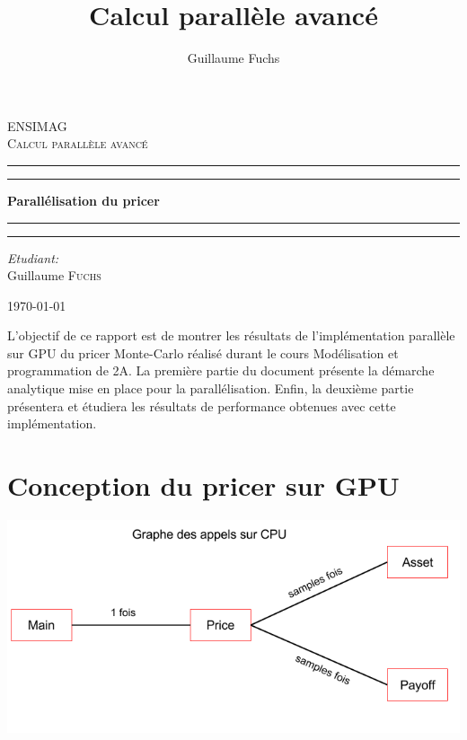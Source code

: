 \documentclass[french,12pt,a4paper]{article}
\title{Calcul parallèle avancé}
\author{Guillaume Fuchs}
\begin{document}
\begin{titlepage}
\begin{center}

\textsc{\LARGE ENSIMAG}\\[1.5cm]

\textsc{\Large Calcul parallèle avancé}\\[0.5cm]

 \hrule
 \hrule 

\vspace{7mm}
{ \huge \bfseries Parallélisation du pricer}

\vspace{7mm}
\hrule
\hrule

\vspace{7mm}
\begin{minipage}{0.4\textwidth}
\begin{flushleft} \large
\emph{Etudiant:}\\
Guillaume \textsc{Fuchs}\\
\end{flushleft}
\end{minipage}

\vfill

{\large \today}

\end{center}
\end{titlepage}
\newpage

L'objectif de ce rapport est de montrer les résultats de l'implémentation parallèle sur GPU du pricer Monte-Carlo réalisé durant le cours Modélisation et programmation de 2A. La première partie du document présente la démarche analytique mise en place pour la parallélisation. Enfin, la deuxième partie présentera et étudiera les résultats de performance obtenues avec cette implémentation. 

\section{Conception du pricer sur GPU}

\begin{center}
\includegraphics[scale=0.6]{appelCPU.png}
\end{center}
\end{document}
